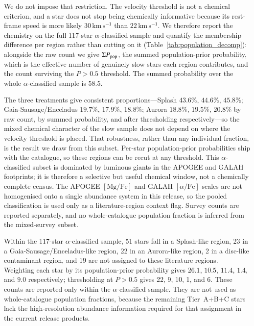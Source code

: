 \documentclass{aa}  %
\newcommand{\kms}{\ensuremath{\,\mathrm{km\,s^{-1}}}\xspace}
\begin{document}
We do not impose that restriction.  The velocity threshold is not a
chemical criterion, and a star does not stop being chemically informative
because its rest-frame speed is more likely $30\kms$ than $22\kms$.  We
therefore report the chemistry on the full 117-star $\alpha$-classified
sample and quantify the membership difference per region rather than
cutting on it (Table~\ref{tab:population_decomp}): alongside the raw count
we give $\Sigma P_{\rm pop}$, the summed population-prior probability,
which is the effective number of genuinely slow stars each region
contributes, and the count surviving the $P>0.5$ threshold.  The summed
probability over the whole $\alpha$-classified sample is $58.5$.

The three treatments give consistent proportions---Splash $43.6\%$,
$44.6\%$, $45.8\%$; Gaia-Sausage/Enceladus $19.7\%$, $17.9\%$, $18.8\%$;
Aurora $18.8\%$, $19.5\%$, $20.8\%$ by raw count, by summed probability,
and after thresholding respectively---so the mixed chemical character of
the slow sample does not depend on where the velocity threshold is
placed.  That robustness, rather than any individual fraction, is the
result we draw from this subset.  Per-star population-prior probabilities
ship with the catalogue, so these regions can be recut at any threshold.
This $\alpha$-classified subset is dominated by luminous giants
in the APOGEE and GALAH footprints; it is therefore a selective but
useful chemical window, not a chemically complete census.  The APOGEE
$[\mathrm{Mg/Fe}]$ and GALAH $[\alpha/\mathrm{Fe}]$ scales are not
homogenised onto a single abundance system in this release, so the pooled
classification is used only as a literature-region context flag.  Survey
counts are reported separately, and no whole-catalogue population fraction
is inferred from the mixed-survey subset.

Within the 117-star $\alpha$-classified sample, 51 stars fall in a
Splash-like region, 23 in a Gaia-Sausage/Enceladus-like region, 22 in an
Aurora-like region, 2 in a disc-like contaminant region, and 19 are not
assigned to these literature regions.  Weighting each star by its
population-prior probability gives $26.1$, $10.5$, $11.4$, $1.4$, and
$9.0$ respectively; thresholding at $P>0.5$ gives 22, 9, 10, 1, and 6.
These counts are reported only within the $\alpha$-classified sample.
They are not used as whole-catalogue population fractions, because the
remaining Tier~A+B+C stars lack the high-resolution abundance
information required for that assignment in the current release products.
\end{document}
